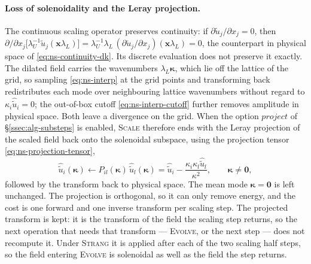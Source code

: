 \documentclass{article}
\begin{document}
\paragraph{Loss of solenoidality and the Leray projection.}
The continuous scaling operator preserves continuity: if
$\partial \tilde u_j/\partial x_j = 0$, then
$\partial/\partial x_j \bigl[\lambda_U^{-1} \tilde u_j(\mathbf{x} \lambda_L)\bigr]
= \lambda_U^{-1} \lambda_L\, (\partial \tilde u_j/\partial x_j)(\mathbf{x} \lambda_L) = 0$,
the counterpart in physical space of \eqref{eq:ns-continuity-dk}. Its discrete
evaluation does not preserve it exactly. The dilated field carries the
wavenumbers $\lambda_L \boldsymbol{\kappa}$, which lie off the lattice of the grid, so
sampling \eqref{eq:ns-interp} at the grid points and transforming back
redistributes each mode over neighbouring lattice wavenumbers without regard
to $\kappa_i \hat{\tilde u}_i = 0$; the out-of-box cutoff \eqref{eq:ns-interp-cutoff}
further removes amplitude in physical space. Both leave a divergence on the
grid. When the option $\mathit{project}$ of \S\ref{ssec:alg-substeps} is
enabled, \textsc{Scale} therefore ends with the Leray projection of the
scaled field back onto the solenoidal subspace, using the projection tensor
\eqref{eq:ns-projection-tensor},
\begin{equation}\label{eq:ns-leray-scale}
  \hat{\tilde u}_i(\boldsymbol{\kappa}) \gets P_{il}(\boldsymbol{\kappa})\, \hat{\tilde u}_l(\boldsymbol{\kappa})
  = \hat{\tilde u}_i - \frac{\kappa_i \kappa_l \hat{\tilde u}_l}{\kappa^2},
  \qquad \boldsymbol{\kappa} \neq \mathbf{0},
\end{equation}
followed by the transform back to physical space. The mean mode
$\boldsymbol{\kappa} = \mathbf{0}$ is left unchanged. The projection is orthogonal, so
it can only remove energy, and the cost is one forward and one inverse
transform per scaling step. The projected transform is kept: it is the
transform of the field the scaling step returns, so the next operation that
needs that transform --- \textsc{Evolve}, or the next step --- does not
recompute it. Under \textsc{Strang} it is applied after each of
the two scaling half steps, so the field entering \textsc{Evolve} is
solenoidal as well as the field the step returns.
\end{document}
